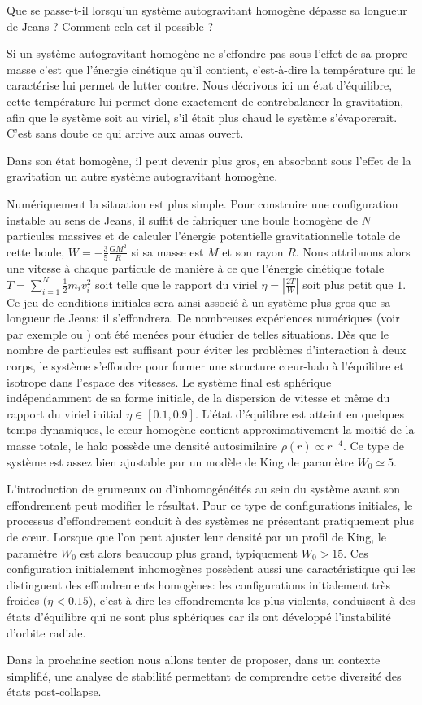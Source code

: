 Que se passe-t-il lorsqu'un système autogravitant homogène dépasse sa longueur de Jeans ?
Comment cela est-il possible ?

Si un système autogravitant homogène ne s'effondre pas sous l'effet de sa propre masse c'est que l'énergie cinétique qu'il contient, c'est-à-dire la
température qui le caractérise lui permet de lutter contre. Nous décrivons ici un état d'équilibre, cette température lui permet
donc exactement de contrebalancer la gravitation, afin que le système soit \og au viriel\fg, s'il était plus chaud le système s'évaporerait.
C'est sans doute ce qui arrive aux amas ouvert.

Dans son état homogène, il peut devenir plus gros, en absorbant sous l'effet de la gravitation un autre système autogravitant homogène.

Numériquement la situation est plus simple. Pour construire une configuration instable au sens de Jeans, il suffit de fabriquer une boule homogène de
$N$ particules massives et de calculer l'énergie potentielle gravitationnelle totale de cette boule, $W=-\frac{3}{5}\frac{GM^2}{R}$ si sa masse est
$M$ et son rayon $R$. Nous attribuons alors une vitesse à chaque particule de manière à ce que l'énergie cinétique totale $T=\sum_{i=1}^N\frac{1}{2}m_i
v_i^2$ soit telle que le rapport du viriel $\eta=\left|\frac{2T}{W}\right|$ soit plus petit que $1$. Ce jeu de conditions initiales sera ainsi associé
à un système plus gros que sa longueur de Jeans: il s'effondrera. De nombreuses expériences numériques (voir par exemple \cite{roy} ou
\cite{Joyceetal}) ont été menées pour étudier de telles situations. Dès que le nombre de particules est suffisant pour
éviter les problèmes d'interaction à deux corps, le système s'effondre pour former une structure cœur-halo à l'équilibre et isotrope dans
l'espace des vitesses. Le système final est sphérique indépendamment de sa forme initiale, de la dispersion de vitesse et même du rapport du viriel
initial $\eta\in[0.1, 0.9]$. L'état d'équilibre est atteint en quelques temps dynamiques, le cœur homogène contient approximativement la moitié de la
masse totale, le halo possède une densité autosimilaire $\rho(r)\propto r^{-4}$. Ce type de système est assez bien ajustable par un modèle de King de
paramètre $W_0\simeq 5$.

L'introduction de grumeaux ou d'inhomogénéités au sein du système avant son effondrement peut modifier le résultat. Pour ce type de configurations
initiales, le processus d'effondrement conduit à des systèmes ne présentant pratiquement plus de cœur. Lorsque que l'on peut ajuster leur densité
par un profil de King, le paramètre $W_0$ est alors beaucoup plus grand, typiquement  $W_0>15$. Ces configuration initialement inhomogènes possèdent
aussi une caractéristique qui les distinguent des effondrements homogènes: les configurations initialement très froides ($\eta<0.15$), c'est-à-dire
les effondrements les plus violents, conduisent à des états d'équilibre qui ne sont plus sphériques car ils ont développé l'instabilité d'orbite
radiale.


Dans la prochaine section nous allons tenter de proposer, dans un contexte simplifié, une analyse de stabilité permettant de comprendre cette diversité
des états post-collapse.

